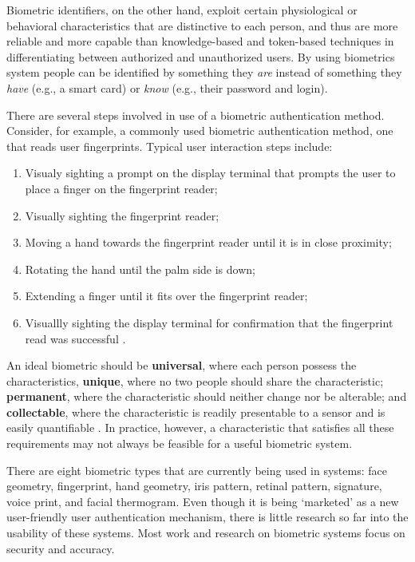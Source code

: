 \documentclass{article}
\begin{document}
Biometric identifiers, on the other hand, exploit certain physiological or behavioral characteristics that are distinctive to each person, and thus are more reliable and more capable than knowledge-based and token-based techniques in differentiating between authorized and unauthorized users. By using biometrics system people can be identified by something they \textit{are} instead of something they \textit{have} (e.g., a smart card) or \textit{know} (e.g., their password and login). 

There are several steps involved in use of a biometric authentication method. Consider, for example, a commonly used biometric authentication method, one that reads user fingerprints. Typical user interaction steps include:
\begin{enumerate}
\item Visualy sighting a prompt on the display terminal that prompts the user to place a finger on the fingerprint reader;
\item Visually sighting the fingerprint reader;
\item Moving a hand towards the fingerprint reader until it is in close proximity;
\item Rotating the hand until the palm side is down;
\item Extending a finger until it fits over the fingerprint reader;
\item Visuallly sighting the display terminal for confirmation that the fingerprint read was successful \cite{schultz2001usability}.
\end{enumerate}

An ideal biometric should be \textbf{universal}, where each person possess the characteristics, \textbf{unique}, where no two people should share the characteristic; \textbf{permanent}, where the characteristic should neither change nor be alterable; and \textbf{collectable}, where the characteristic is readily presentable to a sensor and is easily quantifiable \cite{jain2000biometric}. In practice, however, a characteristic that satisfies all these requirements may not always be feasible for a useful biometric system.

There are eight biometric types that are currently being used in systems: face geometry, fingerprint, hand geometry, iris pattern, retinal pattern, signature, voice print, and facial thermogram. Even though it is being `marketed' as a new user-friendly user authentication mechanism, there is little research so far into the usability of these systems. Most work and research on biometric systems focus on security and accuracy. 
\end{document}
